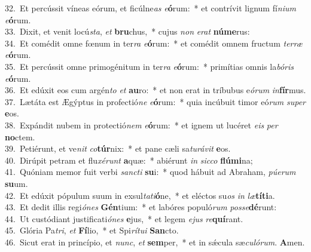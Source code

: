 {32.~}Et percússit víneas eórum, et ficúlne\textit{as} \textit{e}\textbf{ó}rum:~* et contrívit lignum fí\textit{ni}\textit{um} \textit{e}\textbf{ó}rum.\\
{33.~}Dixit, et venit locú\textit{sta}, \textit{et} \textbf{bru}chus,~* cujus \textit{non} \textit{e}\textit{rat} \textbf{nú}\textbf{me}rus:\\
{34.~}Et comédit omne fœnum in ter\textit{ra} \textit{e}\textbf{ó}rum:~* et comédit omnem fructum \textit{ter}\textit{ræ} \textit{e}\textbf{ó}rum.\\
{35.~}Et percússit omne primogénitum in ter\textit{ra} \textit{e}\textbf{ó}rum:~* primítias omnis la\textit{bó}\textit{ris} \textit{e}\textbf{ó}rum.\\
{36.~}Et edúxit eos cum argén\textit{to} \textit{et} \textbf{au}ro:~* et non erat in tríbubus e\textit{ó}\textit{rum} \textit{in}\textbf{fír}mus.\\
{37.~}Lætáta est Ægýptus in profectió\textit{ne} \textit{e}\textbf{ó}rum:~* quia incúbuit timor eó\textit{rum} \textit{su}\textit{per} \textbf{e}os.\\
{38.~}Expándit nubem in protectió\textit{nem} \textit{e}\textbf{ó}rum:~* et ignem ut lucéret \textit{e}\textit{is} \textit{per} \textbf{no}ctem.\\
{39.~}Petiérunt, et ve\textit{nit} \textit{co}\textbf{túr}nix:~* et pane cæli sa\textit{tu}\textit{rá}\textit{vit} \textbf{e}os.\\
{40.~}Dirúpit petram et flu\textit{xé}\textit{runt} \textbf{a}quæ:~* abiérunt \textit{in} \textit{sic}\textit{co} \textbf{flú}\textbf{mi}na;\\
{41.~}Quóniam memor fuit verbi \textit{san}\textit{cti} \textbf{su}i:~* quod hábuit ad Abraham, \textit{pú}\textit{e}\textit{rum} \textbf{su}um.\\
{42.~}Et edúxit pópulum suum in exsul\textit{ta}\textit{ti}\textbf{ó}ne,~* et eléctos su\textit{os} \textit{in} \textit{læ}\textbf{tí}\textbf{ti}a.\\
{43.~}Et dedit illis regi\textit{ó}\textit{nes} \textbf{Gén}tium:~* et labóres populó\textit{rum} \textit{pos}\textit{se}\textbf{dé}runt:\\
{44.~}Ut custódiant justificati\textit{ó}\textit{nes} \textbf{e}jus,~* et legem \textit{e}\textit{jus} \textit{re}\textbf{quí}rant.\\
{45.~}Glória Pa\textit{tri}, \textit{et} \textbf{Fí}lio,~* et Spi\textit{rí}\textit{tu}\textit{i} \textbf{San}cto.\\
{46.~}Sicut erat in princípio, et \textit{nunc}, \textit{et} \textbf{sem}per,~* et in sǽcula sæ\textit{cu}\textit{ló}\textit{rum}. \textbf{A}men.\\
